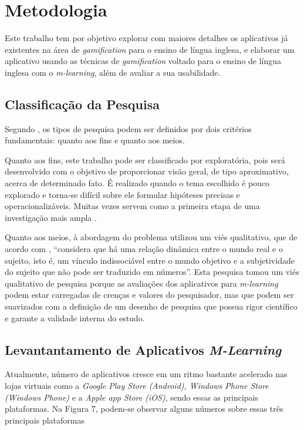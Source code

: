 \documentclass[
	12pt,				%
	openany,			%
	oneside,			%
	a4paper,			%
	english,			%
	french,				%
	spanish,			%
	brazil				%
	]{abntex2}
\begin{document}
\chapter{Metodologia}
Este trabalho tem por objetivo explorar com maiores detalhes os aplicativos já existentes na área de \textit{gamification} para o ensino de língua inglesa, e elaborar um aplicativo usando as técnicas de \textit{gamification} voltado para o ensino de língua inglesa com o \textit{m-learning}, além de avaliar a sua usabilidade.


\section{Classificação da Pesquisa}
Segundo , os tipos de pesquisa podem ser definidos por dois critérios fundamentais: quanto aos fins e quanto aos meios.

	Quanto aos fins, este trabalho pode ser classificado por exploratória, pois será desenvolvido com o objetivo de proporcionar visão geral, de tipo aproximativo, acerca de determinado fato. É realizado quando o tema escolhido é pouco explorado e torna-se difícil sobre ele formular hipóteses precisas e operacionalizáveis. Muitas vezes servem como a primeira etapa de uma investigação mais ampla \cite{GIL}.

	Quanto aos meios, à abordagem do problema utilizou um viés qualitativo, que de acordo com , “considera que há uma relação dinâmica entre o mundo real e o sujeito, isto é, um vínculo indissociável entre o mundo objetivo e a subjetividade do sujeito que não pode ser traduzido em números”.
	Esta pesquisa tomou um viés qualitativo de pesquisa porque as avaliações dos aplicativos para \textit{m-learning} podem estar carregadas de crenças e valores do pesquisador, mas que podem ser suavizados com a definição de um desenho de pesquisa que possua rigor científico e garante a validade interna do estudo.

\section{Levantantamento de Aplicativos \textit{M-Learning}}

	Atualmente, número de aplicativos cresce em um ritmo bastante acelerado nas lojas virtuais como a \textit{Google Play Store (Android), Windows Phone Store (Windows Phone)} e a \textit{Apple app Store (iOS)}, sendo essas as principais plataformas. Na Figura 7, podem-se observar alguns números sobre essas três principais plataformas
\end{document}
